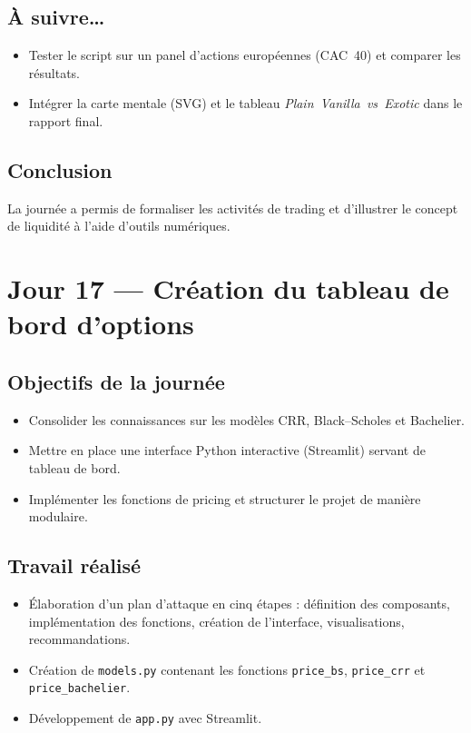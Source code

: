 \documentclass[a4paper,11pt]{article}
\begin{document}
\subsection{À suivre…}
\begin{itemize}
\item Tester le script sur un panel d’actions européennes (CAC 40) et comparer les résultats.
\item Intégrer la carte mentale (SVG) et le tableau \emph{Plain Vanilla vs Exotic} dans le rapport final.
\end{itemize}

\subsection{Conclusion}
La journée a permis de formaliser les activités de trading et d’illustrer le concept de liquidité à l’aide d’outils numériques.

\newpage


\section{Jour 17 --- Création du tableau de bord d’options}

\subsection{Objectifs de la journée}
\begin{itemize}
    \item Consolider les connaissances sur les modèles CRR, Black--Scholes et Bachelier.
    \item Mettre en place une interface Python interactive (Streamlit) servant de tableau de bord.
    \item Implémenter les fonctions de pricing et structurer le projet de manière modulaire.
\end{itemize}

\subsection{Travail réalisé}
\begin{itemize}
    \item Élaboration d’un plan d’attaque en cinq étapes : définition des composants, implémentation des fonctions, création de l’interface, visualisations, recommandations.
    \item Création de \texttt{models.py} contenant les fonctions \texttt{price\_bs}, \texttt{price\_crr} et \texttt{price\_bachelier}.
    \item Développement de \texttt{app.py} avec Streamlit.
\end{itemize}
\end{document}
